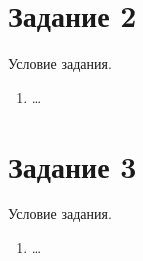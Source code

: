 \newpage
\section*{Задание 2}
Условие задания.
\begin{enumerate}[label=(\roman{*})]
	\item \ldots
\end{enumerate}

\newpage
\section*{Задание 3}
Условие задания.
\begin{enumerate}[label=(\roman{*})]
	\item \ldots
\end{enumerate}